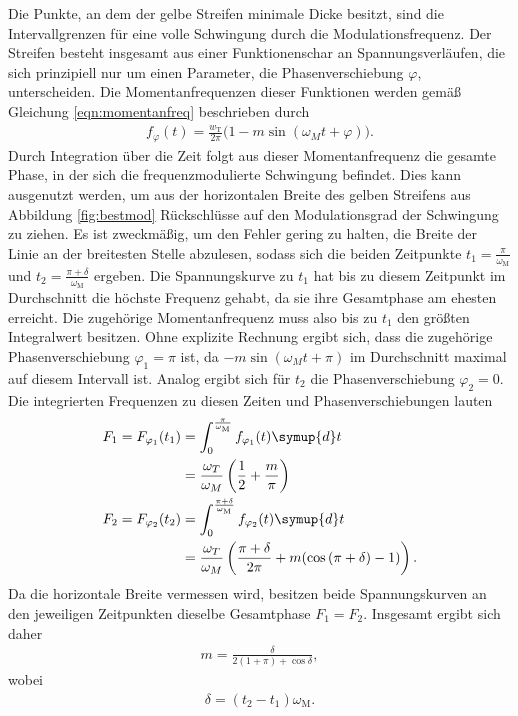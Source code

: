 Die Punkte, an dem der gelbe Streifen minimale Dicke besitzt, sind die
Intervallgrenzen für eine volle Schwingung durch die Modulationsfrequenz. Der Streifen besteht insgesamt aus
einer Funktionenschar an Spannungsverläufen, die sich prinzipiell nur um einen Parameter, die Phasenverschiebung $\varphi$,
unterscheiden. Die Momentanfrequenzen dieser Funktionen werden gemäß Gleichung \eqref{eqn:momentanfreq} beschrieben durch
\begin{align}
  f_{\varphi}(t) = \frac{w_\text{T}}{2 \pi} \bigl(1 - m \sin{(\omega_M t + \varphi)}\bigr).
\end{align}
Durch Integration über die Zeit folgt aus dieser Momentanfrequenz die gesamte Phase, in der sich die frequenzmodulierte
Schwingung befindet. Dies kann ausgenutzt werden, um aus der horizontalen Breite des gelben Streifens aus Abbildung \ref{fig:bestmod}
Rückschlüsse auf den Modulationsgrad der Schwingung zu ziehen. Es ist zweckmäßig, um den Fehler gering zu halten,
die Breite der Linie an der breitesten Stelle abzulesen, sodass sich die beiden Zeitpunkte $t_1 = \frac{\pi}{\omega_\text{M}}$
und $t_2 = \frac{\pi + \delta}{\omega_\text{M}}$ ergeben. Die Spannungskurve zu $t_1$ hat bis zu diesem
Zeitpunkt im Durchschnitt die höchste Frequenz gehabt, da sie ihre Gesamtphase am ehesten erreicht. Die zugehörige Momentanfrequenz
muss also bis zu $t_1$ den größten Integralwert besitzen. Ohne explizite Rechnung ergibt sich, dass die zugehörige
Phasenverschiebung $\varphi_1 = \pi$ ist, da $-m\sin{(\omega_M t + \pi)}$ im Durchschnitt maximal auf diesem Intervall ist.
Analog ergibt sich für $t_2$ die Phasenverschiebung $\varphi_2 = 0$. Die integrierten Frequenzen zu diesen Zeiten und Phasenverschiebungen lauten
\begin{align}
  F_1 = F_{\varphi_1}(t_1) &= \int_{0}^{\frac{\pi}{\omega_\text{M}}} f_{\varphi_1}(t) \symup{d}t \\
  &= \frac{\omega_T}{\omega_M} \left( \frac12 + \frac{m}{\pi} \right) \\
  F_2 = F_{\varphi_2}(t_2) &= \int_{0}^{\frac{\pi+\delta}{\omega_\text{M}}} f_{\varphi_2}(t) \symup{d}t \\
  &= \frac{\omega_T}{\omega_M} \left( \frac{\pi + \delta}{2 \pi} + m(\cos{(\pi + \delta)} - 1) \right).
\end{align}
Da die horizontale Breite vermessen wird, besitzen beide Spannungskurven an den jeweiligen Zeitpunkten dieselbe Gesamtphase $F_1 = F_2$.
Insgesamt ergibt sich daher
\begin{align}
  m = \frac{\delta}{2(1+\pi) + \cos{\delta}},
\end{align}
wobei
\begin{align}
  \delta = (t_2 - t_1) \omega_\text{M}.
\end{align}

